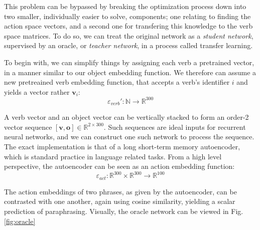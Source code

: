 \documentclass[a4paper,11pt]{article}
\begin{document}
This problem can be bypassed by breaking the optimization process down into two smaller, individually easier to solve, components; one relating to finding the action space vectors, and a second one for transfering this knowledge to the verb space matrices. To do so, we can treat the original network as a \textit{student network}, supervised by an oracle, or \textit{teacher network}, in a process called transfer learning.

To begin with, we can simplify things by assigning each verb a pretrained vector, in a manner similar to our object embedding function. We therefore can assume a new pretreained verb embedding function, that accepts a verb's identifier $i$ and yields a vector rather $\mathbf{v}_i$:
\[
\varepsilon_{verb}' : \mathbb{N} \to \mathbb{R}^{300}
\]

A verb vector and an object vector can be vertically stacked to form an order-2 vector sequence $[\mathbf{v},\mathbf{o}] \in \mathbb{R}^{2\times 300}$. Such sequences are ideal inputs for recurrent neural networks, and we can construct one such network to process the sequence. The exact implementation is that of a long short-term memory autoencoder, which is standard practice in language related tasks. From a high level perspective, the autoencoder can be seen as an action embedding function:
\[
\varepsilon_{act} : \mathbb{R}^{300} \times \mathbb{R}^{300} \to \mathbb{R}^{100}
\]

The action embeddings of two phrases, as given by the autoencoder, can be contrasted with one another, again using cosine similarity, yielding a scalar prediction of paraphrasing. Visually, the oracle network can be viewed in Fig.\ref{fig:oracle}
\end{document}

